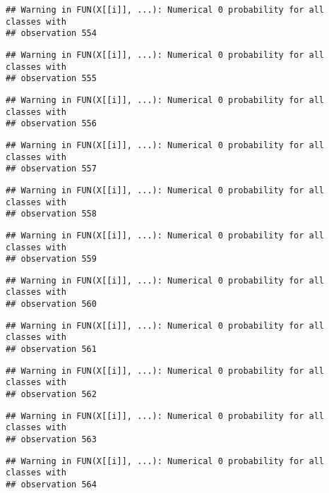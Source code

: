 \documentclass[
]{article}
\begin{document}
\begin{verbatim}
## Warning in FUN(X[[i]], ...): Numerical 0 probability for all classes with
## observation 554
\end{verbatim}

\begin{verbatim}
## Warning in FUN(X[[i]], ...): Numerical 0 probability for all classes with
## observation 555
\end{verbatim}

\begin{verbatim}
## Warning in FUN(X[[i]], ...): Numerical 0 probability for all classes with
## observation 556
\end{verbatim}

\begin{verbatim}
## Warning in FUN(X[[i]], ...): Numerical 0 probability for all classes with
## observation 557
\end{verbatim}

\begin{verbatim}
## Warning in FUN(X[[i]], ...): Numerical 0 probability for all classes with
## observation 558
\end{verbatim}

\begin{verbatim}
## Warning in FUN(X[[i]], ...): Numerical 0 probability for all classes with
## observation 559
\end{verbatim}

\begin{verbatim}
## Warning in FUN(X[[i]], ...): Numerical 0 probability for all classes with
## observation 560
\end{verbatim}

\begin{verbatim}
## Warning in FUN(X[[i]], ...): Numerical 0 probability for all classes with
## observation 561
\end{verbatim}

\begin{verbatim}
## Warning in FUN(X[[i]], ...): Numerical 0 probability for all classes with
## observation 562
\end{verbatim}

\begin{verbatim}
## Warning in FUN(X[[i]], ...): Numerical 0 probability for all classes with
## observation 563
\end{verbatim}

\begin{verbatim}
## Warning in FUN(X[[i]], ...): Numerical 0 probability for all classes with
## observation 564
\end{verbatim}
\end{document}
